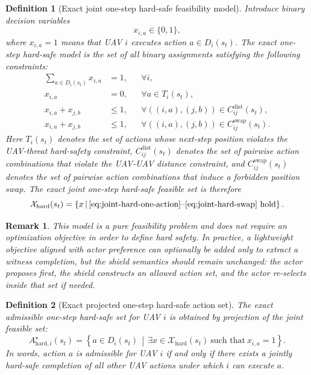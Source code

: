 \documentclass[11pt]{article}
\newtheorem{definition}{Definition}
\newtheorem{remark}{Remark}
\begin{document}
\begin{definition}[Exact joint one-step hard-safe feasibility model]
Introduce binary decision variables
\begin{equation}
x_{i,a} \in \{0,1\},
\end{equation}
where $x_{i,a}=1$ means that UAV $i$ executes action $a \in D_i(s_t)$. The exact one-step hard-safe model is the set of all binary assignments satisfying the following constraints:
\begin{align}
\sum_{a \in D_i(s_t)} x_{i,a} &= 1, && \forall i, \label{eq:joint-hard-one-action}\\
x_{i,a} &= 0, && \forall a \in T_i(s_t), \label{eq:joint-hard-threat}\\
x_{i,a} + x_{j,b} &\le 1, && \forall ((i,a),(j,b)) \in C_{ij}^{\mathrm{dist}}(s_t), \label{eq:joint-hard-pair}\\
x_{i,a} + x_{j,b} &\le 1, && \forall ((i,a),(j,b)) \in C_{ij}^{\mathrm{swap}}(s_t). \label{eq:joint-hard-swap}
\end{align}
Here $T_i(s_t)$ denotes the set of actions whose next-step position violates the UAV-threat hard-safety constraint, $C_{ij}^{\mathrm{dist}}(s_t)$ denotes the set of pairwise action combinations that violate the UAV-UAV distance constraint, and $C_{ij}^{\mathrm{swap}}(s_t)$ denotes the set of pairwise action combinations that induce a forbidden position swap. The exact joint one-step hard-safe feasible set is therefore
\begin{equation}
\mathcal X_{\mathrm{hard}}(s_t)
=
\left\{
x \,\middle|\,
\text{\eqref{eq:joint-hard-one-action}--\eqref{eq:joint-hard-swap} hold}
\right\}.
\end{equation}
\end{definition}

\begin{remark}
This model is a pure feasibility problem and does not require an optimization objective in order to define hard safety. In practice, a lightweight objective aligned with actor preference can optionally be added only to extract a witness completion, but the shield semantics should remain unchanged: the actor proposes first, the shield constructs an allowed action set, and the actor re-selects inside that set if needed.
\end{remark}

\begin{definition}[Exact projected one-step hard-safe action set]
The exact admissible one-step hard-safe set for UAV $i$ is obtained by projection of the joint feasible set:
\begin{equation}
A^{\star}_{\mathrm{hard},i}(s_t)
=
\left\{
a \in D_i(s_t)
\,\middle|\,
\exists x \in \mathcal X_{\mathrm{hard}}(s_t)\ \text{such that}\ x_{i,a}=1
\right\}.
\end{equation}
In words, action $a$ is admissible for UAV $i$ if and only if there exists a jointly hard-safe completion of all other UAV actions under which $i$ can execute $a$.
\end{definition}
\end{document}
